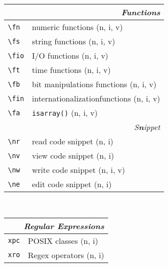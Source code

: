 \documentclass[oneside,10pt,landscape,DIV17]{scrartcl}
\begin{document}
\begin{multicols}{3}
\begin{center}
\begin{tabular}[]{|p{11mm}|p{60mm}|}
\hline
\multicolumn{2}{|r|}{\textsl{\textbf{F}unctions}}              \\[1.0ex]
\hline \verb'\fn ' & numeric functions                       \hfill (n, i, v)\\
\hline \verb'\fs ' & string functions                        \hfill (n, i, v)\\
\hline \verb'\fio' & I/O functions                           \hfill (n, i, v)\\
\hline \verb'\ft ' & time functions                          \hfill (n, i, v)\\
\hline \verb'\fb ' & bit manipulations functions             \hfill (n, i, v)\\
\hline \verb'\fin' & internationalizationfunctions           \hfill (n, i, v)\\
\hline \verb'\fa ' & \texttt{isarray()}                      \hfill (n, i, v)\\
\hline
\hline
\multicolumn{2}{|r|}{\textsl{S\textbf{n}ippet}}                \\[1.0ex]
\hline \verb'\nr'  & read code snippet         \hfill (n, i)   \\
\hline \verb'\nv'  & view code snippet         \hfill (n, i)   \\
\hline \verb'\nw'  & write code snippet        \hfill (n, i, v)\\
\hline \verb'\ne'  & edit code snippet         \hfill (n, i)   \\
\hline
%
\end{tabular}\\
%
%
\begin{tabular}[]{|p{11mm}|p{62mm}|}
\hline
\multicolumn{2}{|r|}{\textsl{Regular E\textbf{x}pressions}}     \\[1.0ex]
\hline     \verb'xpc' &  POSIX classes                 \hfill (n, i)\\ 
\hline     \verb'xro' &  Regex operators               \hfill (n, i)\\ 

\end{tabular}
\end{center}
\end{multicols}
\end{document}
